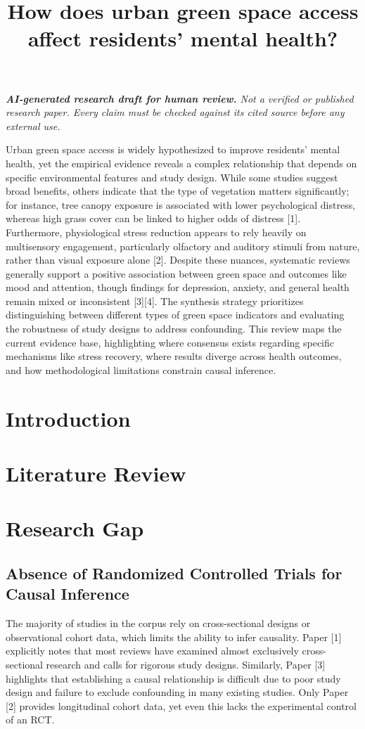 \documentclass[11pt]{article}
\title{How does urban green space access affect residents' mental health?}
\date{}
\begin{document}
\maketitle
\textit{\textbf{AI-generated research draft for human review.} Not a verified or published research paper. Every claim must be checked against its cited source before any external use.}\par

Urban green space access is widely hypothesized to improve residents' mental health, yet the empirical evidence reveals a complex relationship that depends on specific environmental features and study design. While some studies suggest broad benefits, others indicate that the type of vegetation matters significantly; for instance, tree canopy exposure is associated with lower psychological distress, whereas high grass cover can be linked to higher odds of distress [1]. Furthermore, physiological stress reduction appears to rely heavily on multisensory engagement, particularly olfactory and auditory stimuli from nature, rather than visual exposure alone [2]. Despite these nuances, systematic reviews generally support a positive association between green space and outcomes like mood and attention, though findings for depression, anxiety, and general health remain mixed or inconsistent [3][4]. The synthesis strategy prioritizes distinguishing between different types of green space indicators and evaluating the robustness of study designs to address confounding. This review maps the current evidence base, highlighting where consensus exists regarding specific mechanisms like stress recovery, where results diverge across health outcomes, and how methodological limitations constrain causal inference.

\section{Introduction}
\section{Literature Review}
\section{Research Gap}
\subsection{Absence of Randomized Controlled Trials for Causal Inference}
The majority of studies in the corpus rely on cross-sectional designs or observational cohort data, which limits the ability to infer causality. Paper [1] explicitly notes that most reviews have examined almost exclusively cross-sectional research and calls for rigorous study designs. Similarly, Paper [3] highlights that establishing a causal relationship is difficult due to poor study design and failure to exclude confounding in many existing studies. Only Paper [2] provides longitudinal cohort data, yet even this lacks the experimental control of an RCT.
\end{document}
